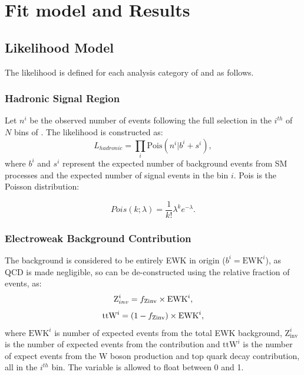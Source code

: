 \chapter{Fit model and Results}
\label{ch:results}

\ifpdf
    \graphicspath{{Chapter7/Figs/Raster/}{Chapter7/Figs/PDF/}{Chapter7/Figs/}}
\else
    \graphicspath{{Chapter7/Figs/Vector/}{Chapter7/Figs/}}
\fi


\section{Likelihood Model}  %
\label{sec:results_likelihood}
The likelihood is defined for each analysis category of \nb and \nj as follows.

\subsection{Hadronic Signal Region}

Let $n^i$ be the observed number of events 
following the full selection in the $i^{th}$ of $N$ bins of \HT. The likelihood
is constructed as:
% 
\begin{equation}
L_{hadronic} = \prod_i \text{Pois}(n^i | b^i + s^i),
\end{equation}
% 
where $b^i$ and $s^i$ represent the expected number of background events from SM 
processes and the expected number of signal events in the bin $i$. Pois is 
the Poisson distribution:

\begin{equation}
Pois(k;\lambda) = \frac{1}{k!}\lambda^k e^{-\lambda}.
\end{equation}


\subsection{Electroweak Background Contribution}
The background is considered to be entirely EWK in origin ($b^i = \text{EWK}^i$), as QCD
is made negligible, so can be de-constructed using the relative fraction
of \zinv events, \fzinv as:
% 
\begin{equation}
\text{Z}_{inv}^i = f_{\text{Zinv}} \times \text{EWK}^i,
\label{eq:ewk_frac_z}
\end{equation}
\begin{equation}
\text{ttW}^i = (1-f_{\text{Zinv}}) \times \text{EWK}^i,
\label{eq:ewk_frac_ttw}
\end{equation}
% 
where $\text{EWK}^i$ is number of expected events from the total EWK background,
$\text{Z}_{\text{inv}}^i$ is the number of expected events from the \zinv 
contribution and $\text{ttW}^i$ is the number of expect events from the W boson 
production and top quark decay contribution, all in the $i^{th}$ bin. The variable 
\fzinv is allowed to float between 0 and 1.

